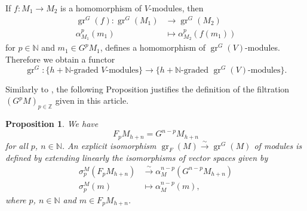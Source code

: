 \documentclass[12pt, a4paper]{article}
\newtheorem{proposition}[theorem]{Proposition}
\theoremstyle{remark}
\DeclareMathOperator{\gr}{gr}
\begin{document}
If $f: M_1 \to M_2$ is a homomorphism of $V$-modules, then
\begin{align*}
  \gr^G(f): \gr^G(M_1) &\to \gr^G(M_2) \\
  \alpha^p_{M_1}(m_1) &\mapsto \alpha^p_{M_2}(f(m_1))
\end{align*}
for $p\in \mathbb{N}$ and $m_1\in G^pM_1$, defines a homomorphism of $\gr^G(V)$-modules.
Therefore we obtain a functor
\begin{equation*}
  \gr^G: \{\text{$h + \mathbb{N}$-graded $V$-modules}\} \to \{\text{$h + \mathbb{N}$-graded $\gr^G(V)$-modules}\}.
\end{equation*}

Similarly to , the following Proposition justifies the definition of the filtration $(G^pM)_{p\in \mathbb{Z}}$ given in this article.

\begin{proposition}
  \label{prp:6}
  We have
  \begin{equation*}
    F_pM_{h + n} = G^{n - p}M_{h + n}
  \end{equation*}
  for all $p$, $n \in \mathbb{N}$.
  An explicit isomorphism $\gr_F(M) \xrightarrow{\sim} \gr^G(M)$ of modules is defined by extending linearly the isomorphisms of vector spaces given by
  \begin{align*}
    \sigma^M_p(F_pM_{h + n}) &\xrightarrow{\sim} \alpha^{n - p}_M(G^{n - p}M_{h + n}) \\
    \sigma^M_p(m) &\mapsto \alpha^{n - p}_M(m),
  \end{align*}
  where $p$, $n\in \mathbb{N}$ and $m \in F_pM_{h + n}$.
\end{proposition}
\end{document}
